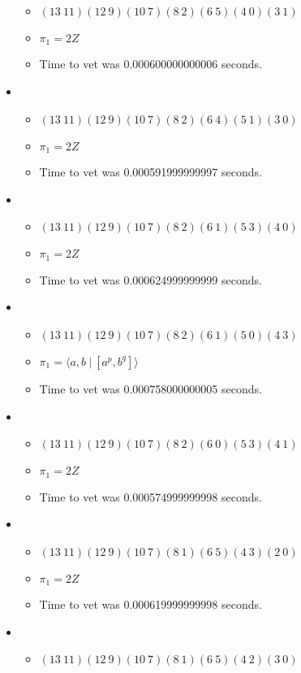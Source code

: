 \documentclass{article}
\begin{document}
\begin{itemize}
\begin{itemize}
      \item $(13\ 11)(12\ 9)(10\ 7)(8\ 2)(6\ 5)(4\ 0)(3\ 1)$
      \item $\pi_1 =2 Z$
      \item Time to vet was 0.000600000000006 seconds.
\end{itemize}
\item \begin{itemize}
      \item $(13\ 11)(12\ 9)(10\ 7)(8\ 2)(6\ 4)(5\ 1)(3\ 0)$
      \item $\pi_1 =2 Z$
      \item Time to vet was 0.000591999999997 seconds.
\end{itemize}
\item \begin{itemize}
      \item $(13\ 11)(12\ 9)(10\ 7)(8\ 2)(6\ 1)(5\ 3)(4\ 0)$
      \item $\pi_1 =2 Z$
      \item Time to vet was 0.000624999999999 seconds.
\end{itemize}
\item \begin{itemize}
      \item $(13\ 11)(12\ 9)(10\ 7)(8\ 2)(6\ 1)(5\ 0)(4\ 3)$
      \item $\pi_1 = \langle a,b\ |\ [a^p,b^q]\rangle$
      \item Time to vet was 0.000758000000005 seconds.
\end{itemize}
\item \begin{itemize}
      \item $(13\ 11)(12\ 9)(10\ 7)(8\ 2)(6\ 0)(5\ 3)(4\ 1)$
      \item $\pi_1 =2 Z$
      \item Time to vet was 0.000574999999998 seconds.
\end{itemize}
\item \begin{itemize}
      \item $(13\ 11)(12\ 9)(10\ 7)(8\ 1)(6\ 5)(4\ 3)(2\ 0)$
      \item $\pi_1 =2 Z$
      \item Time to vet was 0.000619999999998 seconds.
\end{itemize}
\item \begin{itemize}
      \item $(13\ 11)(12\ 9)(10\ 7)(8\ 1)(6\ 5)(4\ 2)(3\ 0)$

\end{itemize}
\end{itemize}
\end{document}
